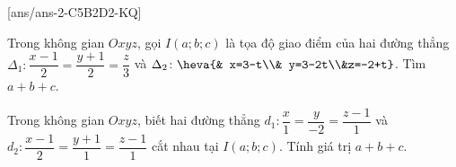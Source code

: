 [ans/ans-2-C5B2D2-KQ]
\TNSA
\begin{ex}%
	Trong không gian $Oxyz$, gọi $I(a;b;c)$ là tọa độ giao điểm của hai đường thẳng $\Delta_1 \colon \dfrac{x-1}{2}=\dfrac{y+1}{2}=\dfrac{z}{3}$ và  $\Delta_2 \colon \heva{& x=3-t\\& y=3-2t\\&z=-2+t}$. Tìm $a+b+c$.
\end{ex}
\begin{ex}%
	Trong không gian $Oxyz$, biết hai đường thẳng $d_1 \colon \dfrac{x}{1}=\dfrac{y}{-2}=\dfrac{z-1}{1}$ và  $d_2 \colon \dfrac{x-1}{2}=\dfrac{y+1}{1}=\dfrac{z-1}{1}$ cắt nhau tại $I(a;b;c)$. Tính giá trị $a+b+c$.
\end{ex}
